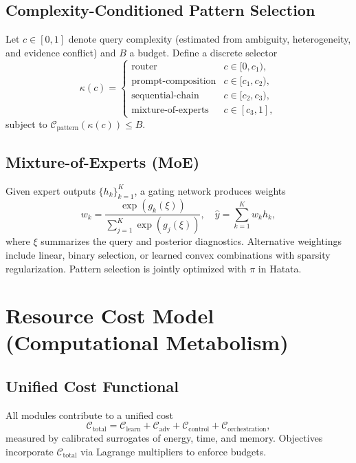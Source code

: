 \documentclass[12pt,a4paper]{article}
\begin{document}
\subsection{Complexity-Conditioned Pattern Selection}
Let $c \in [0,1]$ denote query complexity (estimated from ambiguity, heterogeneity, and evidence conflict) and $B$ a budget. Define a discrete selector
\begin{equation}
\label{eq:selector}
 \kappa(c) = \begin{cases}
  \text{router} & c \in [0, c_1),\\
  \text{prompt-composition} & c \in [c_1, c_2),\\
  \text{sequential-chain} & c \in [c_2, c_3),\\
  \text{mixture-of-experts} & c \in [c_3, 1],
 \end{cases}
\end{equation}
subject to $\mathcal{C}_{\text{pattern}}(\kappa(c)) \le B$.

\subsection{Mixture-of-Experts (MoE)}
Given expert outputs $\{h_k\}_{k=1}^{K}$, a gating network produces weights
\begin{equation}
\label{eq:moe}
 w_k = \frac{\exp(g_k(\xi))}{\sum_{j=1}^{K} \exp(g_j(\xi))}, \quad \hat{y} = \sum_{k=1}^{K} w_k h_k,
\end{equation}
where $\xi$ summarizes the query and posterior diagnostics. Alternative weightings include linear, binary selection, or learned convex combinations with sparsity regularization. Pattern selection is jointly optimized with $\pi$ in Hatata.

\section{Resource Cost Model (Computational Metabolism)}
\subsection{Unified Cost Functional}
All modules contribute to a unified cost
\begin{equation}
\label{eq:totalcost}
 \mathcal{C}_{\text{total}} = \mathcal{C}_{\text{learn}} + \mathcal{C}_{\text{adv}} + \mathcal{C}_{\text{control}} + \mathcal{C}_{\text{orchestration}},
\end{equation}
measured by calibrated surrogates of energy, time, and memory. Objectives incorporate $\mathcal{C}_{\text{total}}$ via Lagrange multipliers to enforce budgets.
\end{document}
